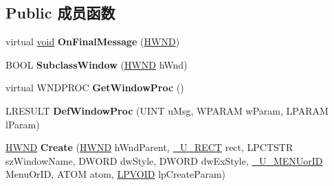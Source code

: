 \subsection*{Public 成员函数}
\begin{DoxyCompactItemize}
\item 
\mbox{\label{class_a_t_l_1_1_c_window_impl_base_t_a44b839fd610df5d30f68e3225691bcc5}} 
virtual \hyperlink{interfacevoid}{void} {\bfseries On\+Final\+Message} (\hyperlink{interfacevoid}{H\+W\+ND})
\item 
\mbox{\label{class_a_t_l_1_1_c_window_impl_base_t_a25fa87867e7a010e5aca4a7d6ffab251}} 
B\+O\+OL {\bfseries Subclass\+Window} (\hyperlink{interfacevoid}{H\+W\+ND} h\+Wnd)
\item 
\mbox{\label{class_a_t_l_1_1_c_window_impl_base_t_ad1859eb4861ea542927dd0b2748c8031}} 
virtual W\+N\+D\+P\+R\+OC {\bfseries Get\+Window\+Proc} ()
\item 
\mbox{\label{class_a_t_l_1_1_c_window_impl_base_t_aa974a986d7b4f083f7f77d534c7836af}} 
L\+R\+E\+S\+U\+LT {\bfseries Def\+Window\+Proc} (U\+I\+NT u\+Msg, W\+P\+A\+R\+AM w\+Param, L\+P\+A\+R\+AM l\+Param)
\item 
\mbox{\label{class_a_t_l_1_1_c_window_impl_base_t_a7c8a2cb2b420c5c6858f1a1c11783e99}} 
\hyperlink{interfacevoid}{H\+W\+ND} {\bfseries Create} (\hyperlink{interfacevoid}{H\+W\+ND} h\+Wnd\+Parent, \hyperlink{class_a_t_l_1_1___u___r_e_c_t}{\+\_\+\+U\+\_\+\+R\+E\+CT} rect, L\+P\+C\+T\+S\+TR sz\+Window\+Name, D\+W\+O\+RD dw\+Style, D\+W\+O\+RD dw\+Ex\+Style, \hyperlink{class_a_t_l_1_1___u___m_e_n_uor_i_d}{\+\_\+\+U\+\_\+\+M\+E\+N\+Uor\+ID} Menu\+Or\+ID, A\+T\+OM atom, \hyperlink{interfacevoid}{L\+P\+V\+O\+ID} lp\+Create\+Param)
\end{DoxyCompactItemize}
